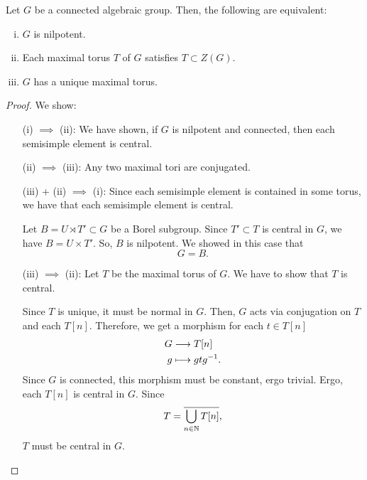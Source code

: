 \begin{theorem}
	Let $G$ be a connected algebraic group. Then, the following are equivalent:
	\begin{enumerate}[(i)]
		\item $G$ is nilpotent.
		\item Each maximal torus $T$ of $G$ satisfies $ T \subset Z(G)$.
		\item $G$ has a unique maximal torus.
	\end{enumerate}
\end{theorem}
\begin{proof}
	We show:
	\begin{enumerate}
		\item[(i) $\implies$ (ii):] We have shown, if $G$ is nilpotent and connected, then each semisimple element is central.
		\item[(ii) $\implies$ (iii):] Any two maximal tori are conjugated.
		\item[(iii) + (ii) $\implies$ (i):] Since each semisimple element is contained in some torus, we have that each semisimple element is central.
		
		Let $B = U \rtimes T' \subset G$ be a Borel subgroup. Since $T' \subset T$ is central in $G$, we have $B = U \times T'$. So, $B$ is nilpotent. We showed in this case that
		\[ G = B. \]
		\item[(iii) $\implies$ (ii):] Let $T$ be the maximal torus of $G$. We have to show that $T$ is central.
		
		Since $T$ is unique, it must be normal in $G$. Then, $G$ acts via conjugation on $T$ and each $T[n]$. Therefore, we get a morphism for each $t \in T[n]$
		\begin{align*}
		G &\overset{}{\longrightarrow} T[n]\\
		g & \longmapsto gtg^{-1}.
		\end{align*}
		Since $G$ is connected, this morphism must be constant, ergo trivial. Ergo, each $T[n]$ is central in $G$. Since
		\[ T = \overline{\bigcup_{n \in \mathbb{N}}{T[n]}}, \]
		$T$ must be central in $G$.
	\end{enumerate}
\end{proof}